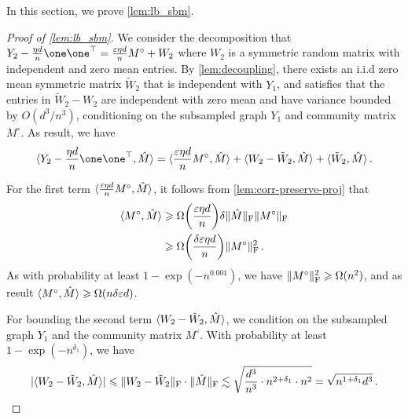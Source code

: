 In this section, we prove \cref{lem:lb_sbm}.
\begin{proof}[Proof of \cref{lem:lb_sbm}]
We consider the decomposition that $Y_2-\frac{\eta d}{n} \one \one^{\top}= \frac{\epsilon \eta d}{n}M^{\circ}+W_2$ where $W_2$ is a symmetric random matrix with independent and zero mean entries.
By \cref{lem:decoupling}, there exists an i.i.d zero mean symmetric matrix $\tilde{W}_2$ that is independent with $Y_1$, and satisfies that the entries in $\tilde{W}_2-W_2$ are independent with zero mean and have variance bounded by $O(d^3/n^3)$, conditioning on the subsampled graph $Y_1$ and community matrix $M^\circ$.
As result, we have
\begin{equation*}
    \iprod{Y_2-\frac{\eta d}{n} \one \one^{\top},\hat{M}}= \iprod{\frac{\epsilon \eta d}{n}M^{\circ}, \hat{M}}+ \iprod{W_2-\tilde{W}_2, \hat{M}}+\iprod{\tilde{W}_2, \hat{M}}\,.
\end{equation*}

For the first term $\langle\frac{\varepsilon \eta d}{n}M^{\circ}, \hat{M}\rangle$, it follows from \cref{lem:corr-preserve-proj} that
\begin{equation*}
\begin{split}
\iprod{M^{\circ}, \hat{M}}
& \geq \Omega \Paren{\frac{\epsilon \eta d}{n}} \delta\normf{\hat{M}} \normf{M^{\circ}} \\
& \geq \Omega \Paren{\frac{\delta\epsilon \eta d}{n}} \normf{M^{\circ}}^2\,.
\end{split}
\end{equation*}
As with probability at least $1-\exp(-n^{0.001})$, we have $\lVert M^{\circ}\rVert_{\mathrm{F}}^2\geqslant \Omega(n^2)$, and as result $\langle M^\circ,\hat{M}\rangle\geqslant \Omega(n\delta \varepsilon d)$.

For bounding the second term $\langle W_2-\tilde{W}_2, \hat{M}\rangle$, we condition on the subsampled graph $Y_1$ and the community matrix $M^\circ$. 
With probability at least $1-\exp(-n^{\delta_1})$, we have 
\begin{align*}
    |\langle W_2-\tilde{W}_2, \hat{M}\rangle|\leqslant \lVert W_2-\tilde{W}_2\rVert_{\mathrm{F}} \cdot \lVert\hat{M}\rVert_{\mathrm{F}}\lesssim \sqrt{\frac{d^3}{n^3} \cdot n^{2+\delta_1} \cdot n^2}= \sqrt{n^{1+\delta_1}d^3}\,. 
\end{align*}


\end{proof}
